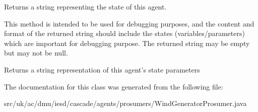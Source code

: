 Returns a string representing the state of this agent. 

This method is intended to be used for debugging purposes, and the content and format of the returned string should include the states (variables/parameters) which are important for debugging purpose. The returned string may be empty but may not be {\ttfamily null}.

\begin{DoxyReturn}{Returns}
a string representation of this agent's state parameters 
\end{DoxyReturn}


The documentation for this class was generated from the following file\-:\begin{DoxyCompactItemize}
\item 
src/uk/ac/dmu/iesd/cascade/agents/prosumers/Wind\-Generator\-Prosumer.\-java\end{DoxyCompactItemize}
